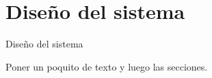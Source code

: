 \section{Diseño del sistema}
\label{Disenio_sistema}

Diseño del sistema
\par
Poner un poquito de texto y luego las secciones.















